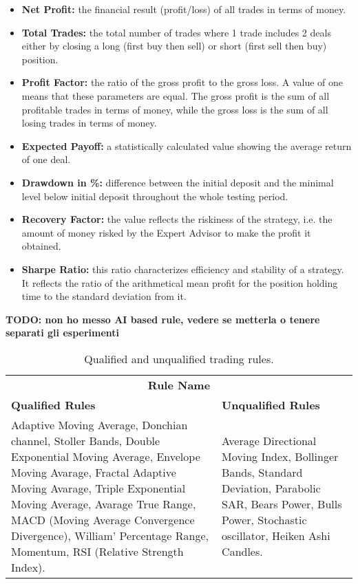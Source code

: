 \begin{itemize}
\setlength\itemsep{0.3em}
\item \textbf{Net Profit:} the financial result (profit/loss) of all trades in terms of money.
\item \textbf{Total Trades:} the total number of trades where 1 trade includes 2 deals either by closing a long (first buy then sell) or short (first sell then buy) position.
\item \textbf{Profit Factor:} the ratio of the gross profit to the gross loss. A value of one means that these parameters are equal. The gross profit is the sum of all profitable trades in terms of money, while the gross loss is the sum of all losing trades in terms of money.
\item \textbf{Expected Payoff:} a statistically calculated value showing the average return of one deal. 
\item \textbf{Drawdown in \%:} difference between the initial deposit and the minimal level below initial deposit throughout the whole testing period.
\item \textbf{Recovery Factor:} the value reflects the riskiness of the strategy, i.e. the amount of money risked by the Expert Advisor to make the profit it obtained.
\item \textbf{Sharpe Ratio:} this ratio characterizes efficiency and stability of a strategy. It reflects the ratio of the arithmetical mean profit for the position holding time to the standard deviation from it.
\end{itemize}

\textbf{TODO: non ho messo AI based rule, vedere se metterla o tenere separati gli esperimenti}
\begin{table}[h!]
  \begin{center} 
    \caption{Qualified and unqualified trading rules.}
    \label{tab:qualrules}
    \begin{tabular}{p{6cm}  p{6cm} }
    \hline
    \multicolumn{2}{c}{\textbf{Rule Name}}
    \\\cline{1-2}
    \textbf{Qualified Rules} & \textbf{Unqualified Rules}\\
    \hline
    Adaptive Moving Average, Donchian channel, Stoller Bands,  Double Exponential Moving Average, Envelope Moving Avarage,  Fractal Adaptive Moving Avarage, Triple Exponential Moving Average, Avarage True Range,  MACD (Moving Average Convergence Divergence),  William' Percentage Range, Momentum, RSI (Relative Strength Index). 
    &
    Average Directional Moving Index, Bollinger Bands, Standard Deviation, Parabolic SAR, Bears Power, Bulls Power, Stochastic oscillator, Heiken Ashi Candles.\\
      \hline
    \end{tabular}
  \end{center}
\end{table}



